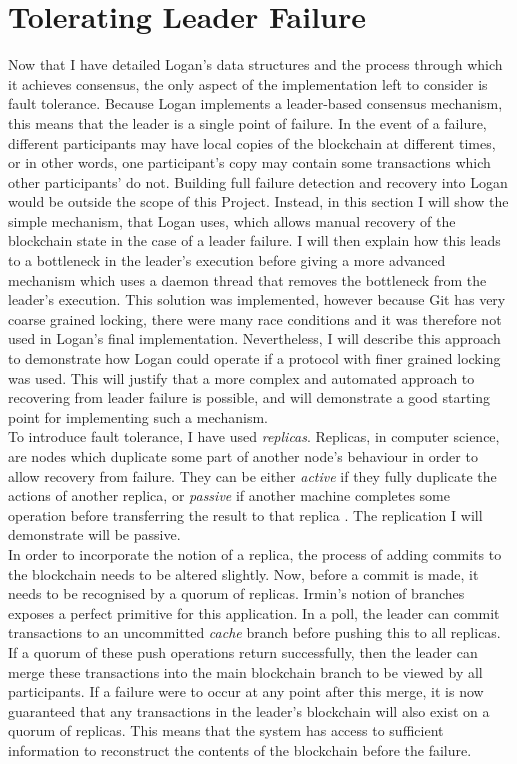 \documentclass[12pt,a4paper,twoside,openright]{report}
\begin{document}
	\section{Tolerating Leader Failure}\label{sec:faulttol}
	Now that I have detailed Logan's data structures and the process through which it achieves consensus, the only aspect of the implementation left to consider is fault tolerance.
	Because Logan implements a leader-based consensus mechanism, this means that the leader is a single point of failure.
	In the event of a failure, different participants may have local copies of the blockchain at different times, or in other words, one participant's copy may contain some transactions which other participants' do not.
	Building full failure detection and recovery into Logan would be outside the scope of this Project. 
	Instead, in this section I will show the simple mechanism, that Logan uses, which allows manual recovery of the blockchain state in the case of a leader failure. 
	I will then explain how this leads to a bottleneck in the leader's execution before giving a more advanced mechanism which uses a daemon thread that removes the bottleneck from the leader's execution. 
	This solution was implemented, however because Git has very coarse grained locking, there were many race conditions and it was therefore not used in Logan's final implementation. 
	Nevertheless, I will describe this approach to demonstrate how Logan could operate if a protocol with finer grained locking was used. 
	This will justify that a more complex and automated approach to recovering from leader failure is possible, and will demonstrate a good starting point for implementing such a mechanism. \\

	To introduce fault tolerance, I have used \textit{replicas}. 
	Replicas, in computer science, are nodes which duplicate some part of another node's behaviour in order to allow recovery from failure. 
	They can be either \textit{active} if they fully duplicate the actions of another replica, or \textit{passive} if another machine completes some operation before transferring the result to that replica \parencite{Replication}.
	The replication I will demonstrate will be passive.\\

	In order to incorporate the notion of a replica, the process of adding commits to the blockchain needs to be altered slightly.
	Now, before a commit is made, it needs to be recognised by a quorum of replicas.
	Irmin's notion of branches exposes a perfect primitive for this application.
	In a poll, the leader can commit transactions to an uncommitted \textit{cache} branch before pushing this to all replicas.
	If a quorum of these push operations return successfully, then the leader can merge these transactions into the main blockchain branch to be viewed by all participants.
	If a failure were to occur at any point after this merge, it is now guaranteed that any transactions in the leader's blockchain will also exist on a quorum of replicas.
	This means that the system has access to sufficient information to reconstruct the contents of the blockchain before the failure.\\
\end{document}

